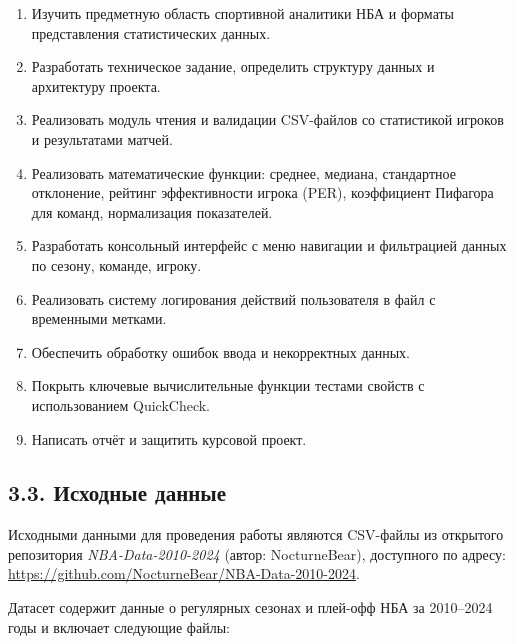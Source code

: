 \documentclass[a4paper, final]{article}
\begin{document}
\begin{enumerate}
    \item Изучить предметную область спортивной аналитики НБА и форматы представления статистических данных.
    \item Разработать техническое задание, определить структуру данных и архитектуру проекта.
    \item Реализовать модуль чтения и валидации CSV-файлов со статистикой игроков и результатами матчей.
    \item Реализовать математические функции: среднее, медиана, стандартное отклонение, рейтинг эффективности игрока (PER), коэффициент Пифагора для команд, нормализация показателей.
    \item Разработать консольный интерфейс с меню навигации и фильтрацией данных по сезону, команде, игроку.
    \item Реализовать систему логирования действий пользователя в файл с временными метками.
    \item Обеспечить обработку ошибок ввода и некорректных данных.
    \item Покрыть ключевые вычислительные функции тестами свойств с использованием QuickCheck.
    \item Написать отчёт и защитить курсовой проект.
\end{enumerate}

\subsection*{3.3. Исходные данные}

Исходными данными для проведения работы являются CSV-файлы из открытого репозитория \textit{NBA-Data-2010-2024} (автор: NocturneBear), доступного по адресу:
\href{https://github.com/NocturneBear/NBA-Data-2010-2024}{https://github.com/NocturneBear/NBA-Data-2010-2024}.

Датасет содержит данные о регулярных сезонах и плей-офф НБА за 2010--2024 годы и включает следующие файлы:
\end{document}
